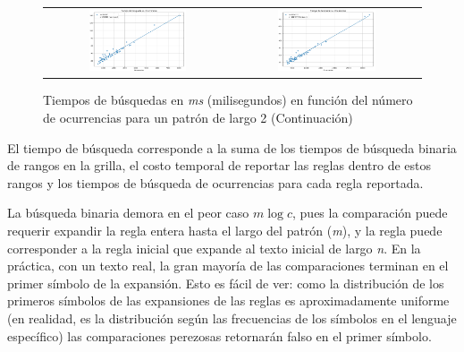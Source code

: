 \begin{figure}[]
    \centering
    \captionsetup{position=above}
    \caption{Tiempos de búsquedas en \textit{ms} (milisegundos) en función del número de ocurrencias para un patrón de largo 2 (Continuación)}
    \hspace*{-\marginparwidth}
    \begin{tabular}{cc} %
        \includegraphics[width=0.55\textwidth]{imagenes/Figure_290801.png} & \includegraphics[width=0.55\textwidth]{imagenes/Figure_1224377.png} \\
    \end{tabular}    
    \label{tab:searchescont}
\end{figure}



El tiempo de búsqueda corresponde a la suma de los tiempos de búsqueda binaria de rangos en la grilla, el costo temporal de reportar las reglas dentro de estos rangos y los tiempos de búsqueda de ocurrencias para cada regla reportada. 

La búsqueda binaria demora en el peor caso $m\log{c}$, pues la comparación puede requerir expandir la regla entera hasta el largo del patrón (\textit{m}), y la regla puede corresponder a la regla inicial que expande al texto inicial de largo \textit{n}. En la práctica, con un texto real, la gran mayoría de las comparaciones terminan en el primer símbolo de la expansión. Esto es fácil de ver: como la distribución de los primeros símbolos de las expansiones de las reglas es aproximadamente uniforme (en realidad, es la distribución según las frecuencias de los símbolos en el lenguaje específico) las comparaciones perezosas retornarán falso en el primer símbolo. 

